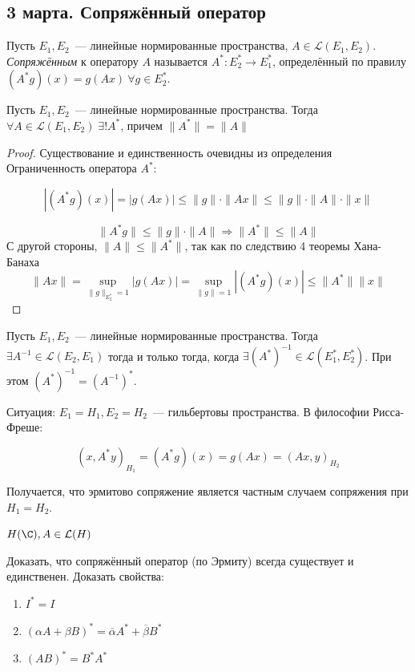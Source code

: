 \subsection{3 марта. Сопряжённый оператор}

\begin{definition}
Пусть $E_1, E_2$~--- линейные нормированные пространства,
$A \in \mathcal{L}(E_1, E_2)$. \textit{Сопряжённым} к оператору $A$ называется
$A^*: E_2^* \to E_1^*$, определённый по правилу
$(A^* g)(x) = g(A x) \ \forall g \in E_2^*$.  
\end{definition}



\begin{theorem}[9.1]
    Пусть $E_1, E_2$~--- линейные нормированные пространства. Тогда $\forall A \in \mathcal{L}(E_1, E_2) \; \exists ! A^*$, причем $\| A^* \| =\| A\|$
\end{theorem}
\begin{proof}
    Существование и единственность очевидны из определения
    Ограниченность оператора $A^*$:

    \[
    |(A^*g)(x)| = |g(Ax)| \leqslant \|g\| \cdot \|Ax\| \leqslant
    \|g\| \cdot \|A\| \cdot \|x\|
    \]
    
    \[
    \|A^* g\| \leqslant \|g\| \cdot \|A\| \Rightarrow
    \|A^*\| \leqslant \|A\|
    \]
    С другой стороны, $\|A\| \leqslant \|A^*\|$, так как по следствию 4 теоремы Хана-Банаха
    \[ \| Ax\| = \sup_{\|g\|_{E_2^*} = 1} |g(Ax)| = 
    \sup_{\|g\|=1} |(A^*g)(x)| \leqslant \|A^*\| \|x\|\]
\end{proof}

\begin{theorem}[9.3 (б/д)]
Пусть $E_1, E_2$~--- линейные нормированные пространства. Тогда
$\exists A^{-1} \in \mathcal{L}(E_2, E_1)$ тогда и только тогда, когда
$\exists (A^*)^{-1} \in \mathcal{L}(E_1^*, E_2^*)$.
При этом $(A^*)^{-1} = (A^{-1})^*$.
\end{theorem}

Ситуация: $E_1 = H_1, E_2 = H_2$~--- гильбертовы пространства.
В философии Рисса-Фреше:

\[ (x, A^*y)_{H_1}=(A^* g)(x)=g(Ax)=(Ax,y)_{H_2}\]

Получается, что эрмитово сопряжение является частным случаем сопряжения при $H_1=H_2$.

$H(\C), A \in \mathcal{L}(H)$

\begin{exercise}
Доказать, что сопряжённый оператор (по Эрмиту) всегда существует и единственен. Доказать свойства:

\begin{enumerate}
    \item $I^* = I$
    \item $(\alpha A + \beta B)^* = \overline{\alpha} A^* + \overline{\beta} B^*$
    \item $(AB)^* = B^* A^*$
\end{enumerate}

\end{exercise}

